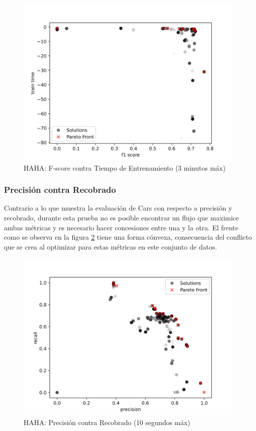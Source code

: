 \begin{figure}[ht]
    \centering
    \includegraphics[scale=0.65]{Pictures/haha_fscore_vs_time_3min.jpg}
    \caption{HAHA: F-score contra Tiempo de Entrenamiento (3 minutos m\'ax)}
    \label{impl:fig:haha:fscore_vs_time_3min}
\end{figure}

\subsubsection{Precisi\'on contra Recobrado}
Contrario a lo que muestra la evaluaci\'on de Cars con respecto a precisi\'on y recobrado, durante esta prueba no es posible encontrar un flujo que maximice ambas m\'etricas y es necesario hacer concesiones entre una y la otra. El frente como se observa en la figura \ref{impl:fig:haha:precision_vs_recall} tiene una forma c\'onvexa, consecuencia del conflicto que se crea al optimizar para estas m\'etricas en este conjunto de datos.

\begin{figure}[ht]
    \centering
    \includegraphics[scale=0.65]{Pictures/haha_precision_vs_recall.jpg}
    \caption{HAHA: Precisi\'on contra Recobrado (10 segundos m\'ax)}
    \label{impl:fig:haha:precision_vs_recall}
\end{figure}

